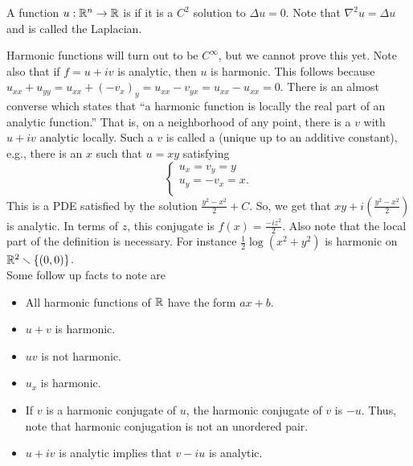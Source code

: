 \documentclass[11pt,leqno,oneside]{amsart}
\numberwithin{thm}{section}
\begin{document}
    \begin{defn}
        A function $u: {\mathbb R}^n \to {\mathbb R}$ is  if it is a $C^2$
        solution to $\Delta u = 0$. Note that $\nabla^2u = \Delta u$ and is
        called the Laplacian.
    \end{defn}
    Harmonic functions will turn out to be $C^\infty$, but we cannot prove this
    yet. Note also that if $f = u+iv$ is analytic, then $u$ is harmonic. This
    follows because $u_{xx}+u_{yy} = u_{xx}+(-v_x)_y = u_{xx}-v_{yx} =
    u_{xx}-u_{xx} = 0$. There is an almost converse which states that ``a
    harmonic function is locally the real part of an analytic function.'' That
    is, on a neighborhood of any point, there is a $v$ with $u+iv$ analytic locally.
    Such a $v$ is called a  (unique up to an additive
    constant), e.g., there is an $x$ such that $u=xy$ satisfying \[
        \begin{cases}
 u_x = v_y = y \\
 u_y = -v_x = x. \\
    \end{cases}
\]
This is a PDE satisfied by the solution $\frac{y^2-x^2}{2} + C$. So, we get
that $xy+i\left( \frac{y^2-x^2}{2} \right)$ is analytic. In terms of $z$, this
conjugate is $f(x) = \frac{-iz^2}{2}$. Also note that the local part of the
definition is necessary. For instance $\frac{1}{2} \log(x^2+y^2)$ is harmonic
on ${\mathbb R}^2 \smallsetminus \{(0,0)\}$. \\

Some follow up facts to note are
\begin{itemize}
    \item All harmonic functions of ${\mathbb R}$ have the form $ax+b$.
    \item $u+v$ is harmonic.
    \item $uv$ is not harmonic.
    \item $u_x$ is harmonic.
    \item If $v$ is a harmonic conjugate of $u$, the harmonic conjugate of $v$
       is $-u$. Thus, note that harmonic conjugation is not an unordered pair.
    \item $u+iv$ is analytic implies that $v-iu$ is analytic.
\end{itemize}
\end{document}
